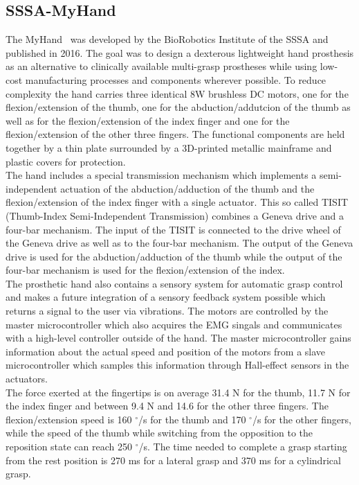 \documentclass[a4paper, 10pt, conference]{ieeeconf}      %
\begin{document}
\subsection{SSSA-MyHand}

The MyHand~\cite{myhand} was developed by the BioRobotics Institute of the SSSA and published in 2016. The goal was to design a dexterous lightweight hand prosthesis as an alternative to clinically available multi-grasp prostheses while using low-cost manufacturing processes and components wherever possible. To reduce complexity the hand carries three identical 8W brushless DC motors, one for the flexion/extension of the thumb, one for the abduction/addutcion of the thumb as well as for the flexion/extension of the index finger and one for the flexion/extension of the other three fingers. The functional components are held together by a thin plate surrounded by a 3D-printed metallic mainframe and plastic covers for protection.\\
The hand includes a special transmission mechanism which implements a semi-independent actuation of the abduction/adduction of the thumb and the flexion/extension of the index finger with a single actuator. This so called TISIT (Thumb-Index Semi-Independent Transmission) combines a Geneva drive and a four-bar mechanism. The input of the TISIT is connected to the drive wheel of the Geneva drive as well as to the four-bar mechanism. The output of the Geneva drive is used for the abduction/adduction of the thumb while the output of the four-bar mechanism is used for the flexion/extension of the index.\\
The prosthetic hand also contains a sensory system for automatic grasp control and makes a future integration of a sensory feedback system possible which returns a signal to the user via vibrations. The motors are controlled by the master microcontroller which also acquires the EMG singals and communicates with a high-level controller outside of the hand. The master microcontroller gains information about the actual speed and position of the motors from a slave microcontroller which samples this information through Hall-effect sensors in the actuators.\\
The force exerted at the fingertips is on average 31.4 N for the thumb, 11.7 N for the index finger and between 9.4 N and 14.6 for the other three fingers. The flexion/extension speed is 160 $^\circ$/s for the thumb and 170 $^\circ$/s for the other fingers, while the speed of the thumb while switching from the opposition to the reposition state can reach 250 $^\circ$/s. The time needed to complete a grasp starting from the rest position is 270 ms for a lateral grasp and 370 ms for a cylindrical grasp.
\end{document}
